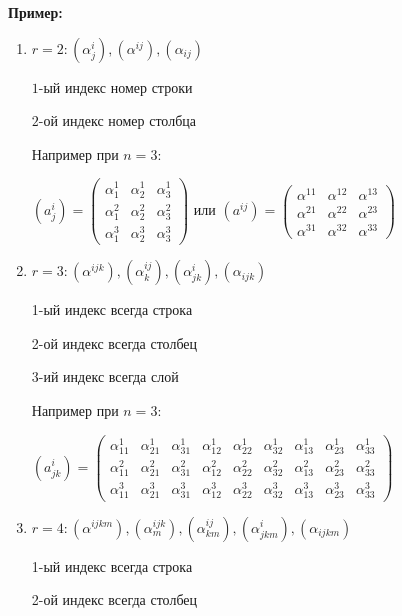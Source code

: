 \textbf{Пример:}
\begin{enumerate}
    

\item $r =2: (\alpha^i_j), (\alpha^{ij}),(\alpha_{ij})$

$1$-ый индекс номер строки

$2$-ой индекс номер столбца

Например при $n= 3$:

$(a^{i}_j) = \begin{pmatrix}
    \alpha^{1}_1 &\alpha^1_2 & \alpha_3^1\\
    \alpha_1^2 & \alpha_2^2 & \alpha_3^2 \\
    \alpha_1^3 & \alpha_2^3 & \alpha_3^3
\end{pmatrix}$ 
или 
$(a^{ij}) = \begin{pmatrix}
    \alpha^{11} &\alpha^{12} & \alpha^{13}\\
    \alpha^{21} & \alpha^{22} & \alpha^{23} \\
    \alpha^{31} & \alpha^{32} & \alpha^{33}
\end{pmatrix}$ 

\item $r=3: (\alpha^{ijk}), (\alpha^{ij}_k), (\alpha^{i}_{jk}), (\alpha_{ijk}) $

    1-ый индекс всегда строка

    2-ой индекс всегда столбец

    3-ий индекс всегда слой

Например при $n=3$:

$(a^i_{jk}) = \left(
\begin{array}{ccc|ccc|ccc}
    \alpha^1_{11} & \alpha^1_{21} & \alpha^1_{31} & \alpha^1_{12} & \alpha^1_{22} & \alpha^1_{32} & \alpha^1_{13} & \alpha^1_{23} & \alpha^1_{33} \\
    \alpha^2_{11} & \alpha^2_{21} & \alpha^2_{31} & \alpha^2_{12} & \alpha^2_{22} & \alpha^2_{32} & \alpha^2_{13} & \alpha^2_{23} & \alpha^2_{33} \\
    \alpha^3_{11} & \alpha^3_{21} & \alpha^3_{31} & \alpha^3_{12} & \alpha^3_{22} & \alpha^3_{32} & \alpha^3_{13} & \alpha^3_{23} & \alpha^3_{33}
\end{array}
\right)$

\item $r=4: (\alpha^{ijkm}),(\alpha^{ijk}_{m}),(\alpha^{ij}_{km}), (\alpha^{i}_{jkm}), (\alpha_{ijkm})$

1-ый индекс всегда строка

2-ой индекс всегда столбец


\end{enumerate}
